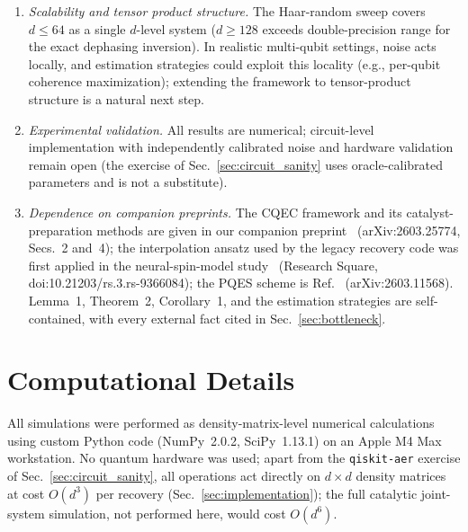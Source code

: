 \documentclass[12pt,a4paper]{article}
\begin{document}
\begin{enumerate}
\item \emph{Scalability and tensor product structure.}
The Haar-random sweep covers $d \leq 64$ as a single $d$-level system ($d \geq 128$ exceeds double-precision range for the exact dephasing inversion).
In realistic multi-qubit settings, noise acts locally, and estimation strategies could exploit this locality (e.g., per-qubit coherence maximization); extending the framework to tensor-product structure is a natural next step.
\item \emph{Experimental validation.}
All results are numerical; circuit-level implementation with independently calibrated noise and hardware validation remain open (the exercise of Sec.~\ref{sec:circuit_sanity} uses oracle-calibrated parameters and is not a substitute).
\item \emph{Dependence on companion preprints.}
The CQEC framework and its catalyst-preparation methods are given in our companion preprint~\cite{Wakaura2026unified} (arXiv:2603.25774, Secs.~2 and~4); the interpolation ansatz used by the legacy recovery code was first applied in the neural-spin-model study~\cite{Wakaura2026catalyst} (Research Square, doi:10.21203/rs.3.rs-9366084); the PQES scheme is Ref.~\cite{Raghoonanan2026} (arXiv:2603.11568).
Lemma~1, Theorem~2, Corollary~1, and the estimation strategies are self-contained, with every external fact cited in Sec.~\ref{sec:bottleneck}.
\end{enumerate}


\section{Computational Details}
\label{sec:computational}

All simulations were performed as density-matrix-level numerical calculations using custom Python code (NumPy~2.0.2, SciPy~1.13.1) on an Apple M4 Max workstation.
No quantum hardware was used; apart from the \texttt{qiskit-aer} exercise of Sec.~\ref{sec:circuit_sanity}, all operations act directly on $d \times d$ density matrices at cost $O(d^3)$ per recovery (Sec.~\ref{sec:implementation}); the full catalytic joint-system simulation, not performed here, would cost $O(d^6)$.
\end{document}
